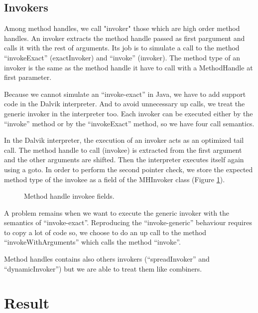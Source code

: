 \documentclass{sig-alternate}
\begin{document}
    \subsection{Invokers}

      Among method handles, we call "invoker" those which are high order method handles.
      An invoker extracts the method handle passed as first pargument and calls it with the rest of arguments.
      Its job is to simulate a call to the method ``invokeExact'' (exactInvoker) and ``invoke'' (invoker).
      The method type of an invoker is the same as the method handle it have to call with a MethodHandle at first parameter.

      Because we cannot simulate an ``invoke-exact'' in Java, we have to add support code in the Dalvik interpreter.
      And to avoid unnecessary up calls, we treat the generic invoker in the interpreter too.
      Each invoker can be executed either by the ``invoke'' method or by the ``invokeExact'' method, so we have four call semantics.

      In the Dalvik interpreter, the execution of an invoker acts as an optimized tail call.
      The method handle to call (invokee) is extracted from the first argument and the other arguments are shifted.
      Then the interpreter executes itself again using a goto.
      In order to perform the second pointer check, we store the expected method type of the invokee as a field of the MHInvoker class (Figure \ref{invokeeFields}).

      \begin{figure}[!h]
        \centering \vspace{-1.5em}
        \caption{Method handle invokee fields.}
        \label{invokeeFields}
      \end{figure}

      A problem remains when we want to execute the generic invoker with the semantics of ``invoke-exact''.
      Reproducing the ``invoke-generic'' behaviour requires to copy a lot of code so,
      we choose to do an up call to the method ``invokeWithArguments'' which calls the method ``invoke''.

      Method handles contains also others invokers (``spreadInvoker'' and ``dynamicInvoker'') but we are able to treat them like combiners.

\section{Result}
\end{document}
